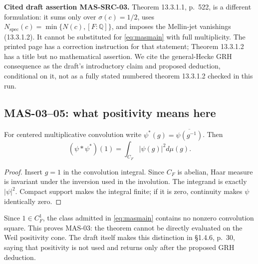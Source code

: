 \documentclass[11pt,a4paper]{article}
\newcommand{\Q}{\mathbb Q}
\newcommand{\fid}[1]{\textsf{#1}}
\begin{document}
\textbf{Cited draft assertion MAS-SRC-03.} Theorem 13.3.1.1, p.~522, is a different formulation: it sums only over $\sigma(c)=1/2$, uses $N_{\mathrm{spec}}(c)=\min\{N(c),[F:\Q]\}$, and imposes the Mellin-jet vanishings (13.3.1.2). It cannot be substituted for \eqref{eq:masmain} with full multiplicity. The printed page has a correction instruction for that statement; Theorem 13.3.1.2 has a title but no mathematical assertion. We cite the general-Hecke GRH consequence as the draft's introductory claim and proposed deduction, conditional on it, not as a fully stated numbered theorem 13.3.1.2 checked in this run.

\subsection{MAS-03--05: what positivity means here}
For centered multiplicative convolution write $\psi^*(g)=\overline{\psi(g^{-1})}$. Then
\begin{equation}\label{eq:squareone}
 (\psi*\psi^*)(1)=\int_{C_F}|\psi(g)|^2d\mu(g).
\end{equation}
\begin{proof}
Insert $g=1$ in the convolution integral. Since $C_F$ is abelian, Haar measure is invariant under the inversion used in the involution. The integrand is exactly $|\psi|^2$. Compact support makes the integral finite; if it is zero, continuity makes $\psi$ identically zero.
\end{proof}
Since $1\in C_F^1$, the class admitted in \eqref{eq:masmain} contains no nonzero convolution square. This proves \fid{MAS-03}: the theorem cannot be directly evaluated on the Weil positivity cone. The draft itself makes this distinction in \S1.4.6, p.~30, saying that positivity is not used and returns only after the proposed GRH deduction.
\end{document}

